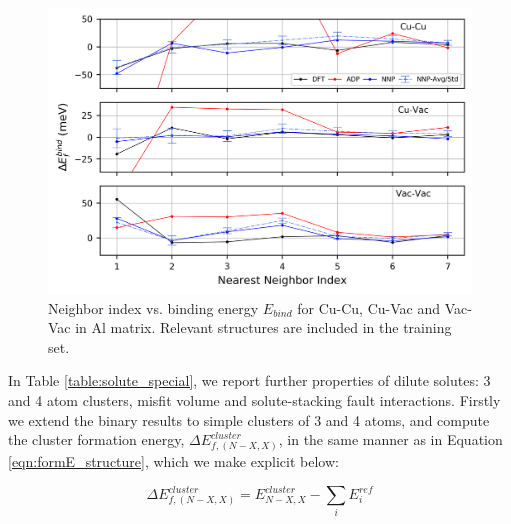 \documentclass{article}
\begin{document}
\begin{figure}[H]%
\centering%
\includegraphics[width=1\textwidth,center]{./figures/solsol_in_al.png}%
\caption{Neighbor index vs. binding energy $E_{bind}$ for Cu-Cu, Cu-Vac and Vac-Vac in Al matrix. 
Relevant structures are included in the training set.}%
\label{fig:solsol_in_al}
\end{figure}


In Table \ref{table:solute_special}, we report further properties of dilute solutes: 3 and 4 atom clusters, misfit volume and solute-stacking fault interactions.
Firstly we extend the binary results to simple clusters of 3 and 4 atoms, and compute the cluster formation energy, $\Delta E^{cluster}_{f,(N-X,X)}$,
in the same manner as in Equation \ref{eqn:formE_structure}, which we make explicit below:

\begin{equation}
\Delta E^{cluster}_{f,(N-X,X)} = E^{cluster}_{N-X,X} - \sum_i E^{ref}_i
\end{equation}
\end{document}
